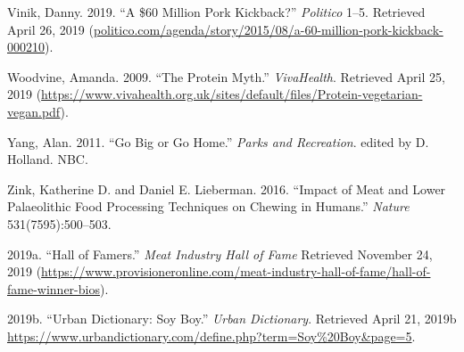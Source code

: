\hypertarget{vinik}{Vinik, Danny. 2019. ``A \$60 Million Pork Kickback?'' \emph{Politico} 1--5. Retrieved April 26, 2019 (\href{http://politico.com/agenda/story/2015/08/a-60-million-pork-kickback-000210}{politico.com/agenda/story/2015/08/a-60-million-pork-kickback-000210}).}

\hypertarget{woodvine}{Woodvine, Amanda. 2009. ``The Protein Myth.'' \emph{VivaHealth}. Retrieved April 25, 2019 (\url{https://www.vivahealth.org.uk/sites/default/files/Protein-vegetarian-vegan.pdf}).}

\hypertarget{yang}{Yang, Alan. 2011. ``Go Big or Go Home.'' \emph{Parks and Recreation}. edited by D. Holland. NBC.}

\hypertarget{zink}{Zink, Katherine D. and Daniel E. Lieberman. 2016. ``Impact of Meat and Lower Palaeolithic Food Processing Techniques on Chewing in Humans.'' \emph{Nature} 531(7595):500--503.}

\hypertarget{2019a}{2019a. ``Hall of Famers.'' \emph{Meat Industry Hall of Fame} Retrieved November 24, 2019 (\url{https://www.provisioneronline.com/meat-industry-hall-of-fame/hall-of-fame-winner-bios}).}

\hypertarget{2019b}{2019b. ``Urban Dictionary: Soy Boy.'' \emph{Urban Dictionary}. Retrieved April 21, 2019b {\url{https://www.urbandictionary.com/define.php?term=Soy\%20Boy\&page=5}}.}
